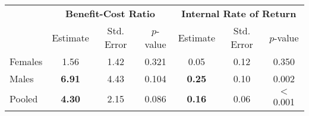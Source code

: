 \begin{tabular}{l c c c c c c} 
\toprule
& \multicolumn{3}{c}{\textbf{Benefit-Cost Ratio}} & \multicolumn{3}{c}{\textbf{Internal Rate of Return}} \\
& Estimate & Std. Error & $p$-value & Estimate & Std. Error & $p$-value \\
\midrule
Females 	& 1.56 & 1.42 & 0.321 & 0.05 & 0.12 & 0.350 \\
Males 	& \textbf{6.91} & 4.43 & 0.104 & \textbf{0.25} & 0.10 & 0.002 \\
Pooled 	& \textbf{4.30} & 2.15 & 0.086 & \textbf{0.16} & 0.06 & $<$ 0.001\\
\bottomrule
\end{tabular}